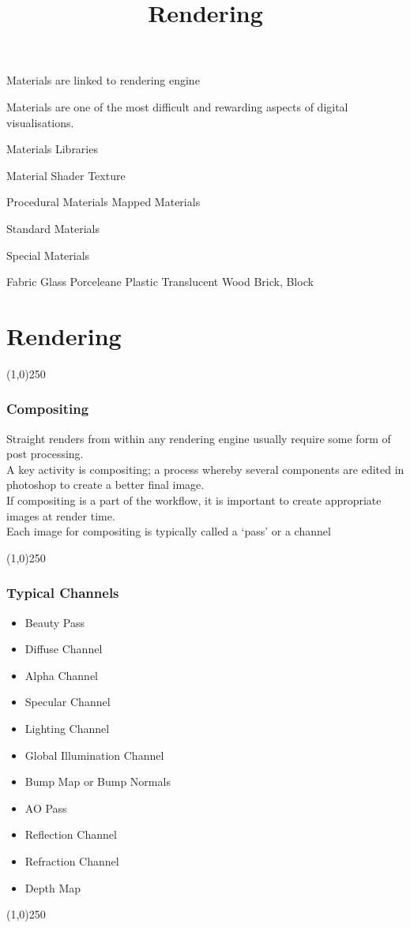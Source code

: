 Materials are linked to rendering engine

Materials are one of the most difficult and rewarding aspects of digital visualisations.

Materials Libraries


Material
Shader
Texture

Procedural Materials
Mapped Materials

Standard Materials

Special Materials



Fabric
Glass
Porceleane
Plastic
Translucent
Wood
Brick, Block






\section{Rendering}
\begin{frame}
\title[Rendering]{Rendering}
\titlepage
\end{frame}\begin{center}\line(1,0){250}\end{center}


\begin{frame}
	\frametitle{Compositing}
	Straight renders from within any rendering engine usually require some form of post processing.\\
	A key activity is compositing; a process whereby several components are edited in photoshop to create a better final image.\\
	If compositing is a part of the workflow, it is important to create appropriate images at render time.\\
	Each image for compositing is typically called a `pass' or a channel
	
\end{frame}
\begin{center}\line(1,0){250}\end{center}


\begin{frame}
	\frametitle{Typical Channels}
	\begin{itemize}
		\item Beauty Pass
		\item Diffuse Channel
		\item Alpha Channel
		\item Specular Channel
		\item Lighting Channel
		\item Global Illumination Channel
		\item Bump Map or Bump Normals
		\item AO Pass
		\item Reflection Channel
		\item Refraction Channel
		\item Depth Map
	\end{itemize}
\end{frame}
\begin{center}\line(1,0){250}\end{center}



